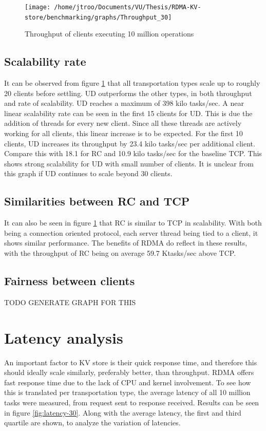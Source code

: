 \begin{figure}
    \centering
    \texttt{[image: /home/jtroo/Documents/VU/Thesis/RDMA-KV-store/benchmarking/graphs/Throughput\_30]}
    \caption{Throughput of clients executing 10 million operations}
    \label{fig:throughput-30}
\end{figure}

\subsection{Scalability rate}\label{subsec:scalability-rate}
It can be observed from figure \ref{fig:throughput-30} that all transportation types scale up to roughly 20 clients before settling.
UD outperforms the other types, in both throughput and rate of scalability.
UD reaches a maximum of 398 kilo tasks/sec.
A near linear scalability rate can be seen in the first 15 clients for UD.
This is due the addition of threads for every new client.
Since all these threads are actively working for all clients, this linear increase is to be expected.
For the first 10 clients, UD increases its throughput by 23.4 kilo tasks/sec per additional client.
Compare this with 18.1 for RC and 10.9 kilo tasks/sec for the baseline TCP.
This shows strong scalability for UD with small number of clients.
It is unclear from this graph if UD continues to scale beyond 30 clients.

\subsection{Similarities between RC and TCP}
It can also be seen in figure \ref{fig:throughput-30} that RC is similar to TCP in scalability.
With both being a connection oriented protocol, each server thread being tied to a client, it shows similar performance.
The benefits of RDMA do reflect in these results, with the throughput of RC being on average 59.7 Ktasks/sec above TCP.

\subsection{Fairness between clients}
TODO GENERATE GRAPH FOR THIS

\section{Latency analysis}\label{sec:latency:analysis}
An important factor to KV store is their quick response time, and therefore this should ideally scale similarly, preferably better, than throughput.
RDMA offers fast response time due to the lack of CPU and kernel involvement.
To see how this is translated per transportation type, the average latency of all 10 million tasks were measured, from request sent to response received.
Results can be seen in figure \ref{fig:latency-30}.
Along with the average latency, the first and third quartile are shown, to analyze the variation of latencies.

